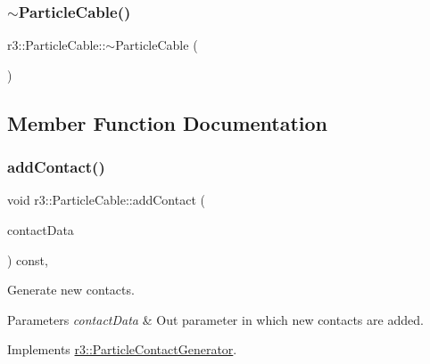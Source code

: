 \subsubsection{\texorpdfstring{$\sim$\+Particle\+Cable()}{~ParticleCable()}}
{\footnotesize\ttfamily r3\+::\+Particle\+Cable\+::$\sim$\+Particle\+Cable (\begin{DoxyParamCaption}{ }\end{DoxyParamCaption})\hspace{0.3cm}{\ttfamily [default]}}



\subsection{Member Function Documentation}
\mbox{\label{classr3_1_1_particle_cable_a5187ee9d99fb41cf6e719c22c9b30a7c}} 
\subsubsection{\texorpdfstring{add\+Contact()}{addContact()}}
{\footnotesize\ttfamily void r3\+::\+Particle\+Cable\+::add\+Contact (\begin{DoxyParamCaption}\item[{\mbox{\hyperlink{classr3_1_1_fixed_size_container}{Fixed\+Size\+Container}}$<$ \mbox{\hyperlink{classr3_1_1_particle_contact}{Particle\+Contact}} $>$ \&}]{contact\+Data }\end{DoxyParamCaption}) const\hspace{0.3cm}{\ttfamily [override]}, {\ttfamily [virtual]}}



Generate new contacts. 


\begin{DoxyParams}{Parameters}
{\em contact\+Data} & Out parameter in which new contacts are added. \\
\hline
\end{DoxyParams}


Implements \mbox{\hyperlink{classr3_1_1_particle_contact_generator_a39a7a8f0d5b31b1ca2c2ace2af8e2978}{r3\+::\+Particle\+Contact\+Generator}}.

\mbox{\label{classr3_1_1_particle_cable_a6cf3d6cff00fa5a7eeb1df8975cd59de}} 
